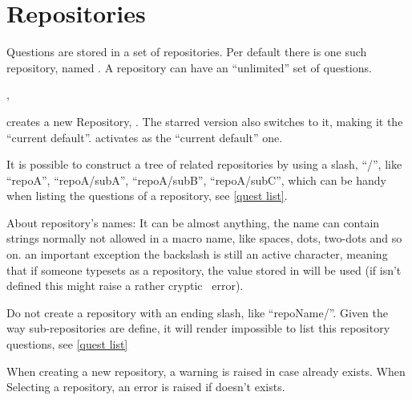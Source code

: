 \documentclass[10pt]{article}
\begin{document}
\section{Repositories}\label{repositories}
Questions are stored in a set of repositories. Per default there is one such repository, named . A repository can have an ``unlimited'' set of questions.

\begin{codedescribe}{,\selectRepository}
\begin{codesyntax}%
\end{codesyntax}
 creates a new Repository, . The starred version also switches to it, making it the ``current default''.
\tsobj{\SelectRepository} activates  as the ``current default'' one.

It is possible to construct a tree of related repositories by using a slash, ``/'', like ``repoA'', ``repoA/subA'', ``repoA/subB'', ``repoA/subC'', which can be handy when listing the questions of a repository, see \ref{quest list}.
\end{codedescribe}

\begin{tsremark}
About repository's names: It can be almost anything, the name can contain strings normally not allowed in a macro name, like spaces, dots, two-dots and so on. an important exception the backslash is still an active character, meaning that if someone typesets \tsobj{\XYZ} as a repository, the value stored in \tsobj{\XYZ} will be used (if \tsobj{\XYZ} isn't defined this might raise a rather cryptic \LaTeXe\ error).
\end{tsremark}

\begin{tsremark}
Do not create a repository with an ending slash, like ``repoName/''. Given the way sub-repositories are define, it will render impossible to list this repository questions, see \ref{quest list}
\end{tsremark}


\begin{tsremark}
When creating a new repository, a warning is raised  in case  already exists. 
When Selecting a repository, an error is raised if  doesn't exists.
\end{tsremark}
\end{document}
